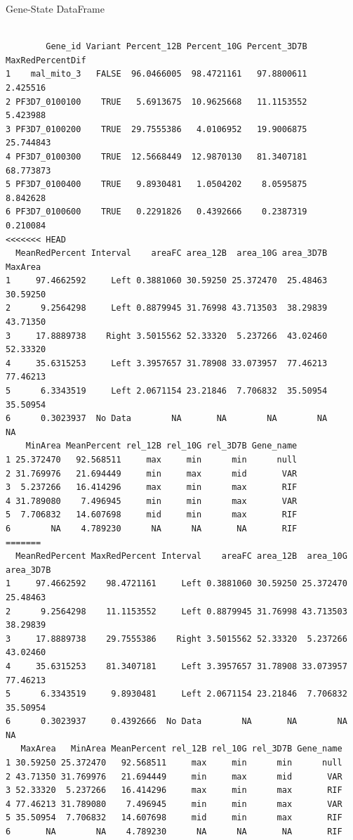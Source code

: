 \documentclass[11pt]{article}
\begin{document}
Gene-State DataFrame
\begin{verbatim}

        Gene_id Variant Percent_12B Percent_10G Percent_3D7B MaxRedPercentDif
1    mal_mito_3   FALSE  96.0466005  98.4721161   97.8800611         2.425516
2 PF3D7_0100100    TRUE   5.6913675  10.9625668   11.1153552         5.423988
3 PF3D7_0100200    TRUE  29.7555386   4.0106952   19.9006875        25.744843
4 PF3D7_0100300    TRUE  12.5668449  12.9870130   81.3407181        68.773873
5 PF3D7_0100400    TRUE   9.8930481   1.0504202    8.0595875         8.842628
6 PF3D7_0100600    TRUE   0.2291826   0.4392666    0.2387319         0.210084
<<<<<<< HEAD
  MeanRedPercent Interval    areaFC area_12B  area_10G area_3D7B  MaxArea
1     97.4662592     Left 0.3881060 30.59250 25.372470  25.48463 30.59250
2      9.2564298     Left 0.8879945 31.76998 43.713503  38.29839 43.71350
3     17.8889738    Right 3.5015562 52.33320  5.237266  43.02460 52.33320
4     35.6315253     Left 3.3957657 31.78908 33.073957  77.46213 77.46213
5      6.3343519     Left 2.0671154 23.21846  7.706832  35.50954 35.50954
6      0.3023937  No Data        NA       NA        NA        NA       NA
    MinArea MeanPercent rel_12B rel_10G rel_3D7B Gene_name
1 25.372470   92.568511     max     min      min      null
2 31.769976   21.694449     min     max      mid       VAR
3  5.237266   16.414296     max     min      max       RIF
4 31.789080    7.496945     min     min      max       VAR
5  7.706832   14.607698     mid     min      max       RIF
6        NA    4.789230      NA      NA       NA       RIF
=======
  MeanRedPercent MaxRedPercent Interval    areaFC area_12B  area_10G area_3D7B
1     97.4662592    98.4721161     Left 0.3881060 30.59250 25.372470  25.48463
2      9.2564298    11.1153552     Left 0.8879945 31.76998 43.713503  38.29839
3     17.8889738    29.7555386    Right 3.5015562 52.33320  5.237266  43.02460
4     35.6315253    81.3407181     Left 3.3957657 31.78908 33.073957  77.46213
5      6.3343519     9.8930481     Left 2.0671154 23.21846  7.706832  35.50954
6      0.3023937     0.4392666  No Data        NA       NA        NA        NA
   MaxArea   MinArea MeanPercent rel_12B rel_10G rel_3D7B Gene_name
1 30.59250 25.372470   92.568511     max     min      min      null
2 43.71350 31.769976   21.694449     min     max      mid       VAR
3 52.33320  5.237266   16.414296     max     min      max       RIF
4 77.46213 31.789080    7.496945     min     min      max       VAR
5 35.50954  7.706832   14.607698     mid     min      max       RIF
6       NA        NA    4.789230      NA      NA       NA       RIF

\end{verbatim}
\end{document}
